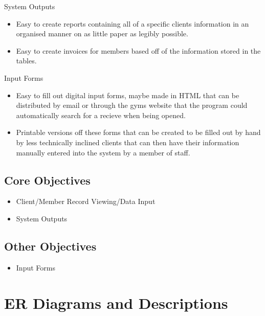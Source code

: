 System Outputs

\begin{itemize}  

        \item Easy to create reports containing all of a specific clients information in an organised manner on as little paper as legibly possible.
        \item Easy to create invoices for members based off of the information stored in the tables.
\end{itemize}

Input Forms

    \begin{itemize}  

        \item Easy to fill out digital input forms, maybe made in HTML that can be distributed by email or through the gyms website that the program could automatically search for a recieve when being opened.
        \item Printable versions off these forms that can be created to be filled out by hand by less technically inclined clients that can then have their information manually entered into the system by a member of staff.

    \end{itemize}

\subsection{Core Objectives}

\begin{itemize}
    \item Client/Member Record Viewing/Data Input
    \item System Outputs
\end{itemize}


\subsection{Other Objectives}

\begin{itemize}
    \item Input Forms
\end{itemize}

\section{ER Diagrams and Descriptions}


